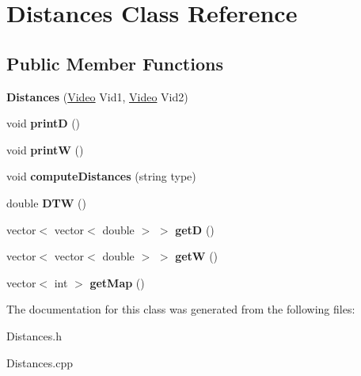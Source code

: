 \hypertarget{classDistances}{}\section{Distances Class Reference}
\label{classDistances}
\subsection*{Public Member Functions}
\begin{DoxyCompactItemize}
\item 
\hypertarget{classDistances_ab114594a2ed9235f058fe11a37fb6ec2}{}{\bfseries Distances} (\hyperlink{classVideo}{Video} Vid1, \hyperlink{classVideo}{Video} Vid2)\label{classDistances_ab114594a2ed9235f058fe11a37fb6ec2}

\item 
\hypertarget{classDistances_a5180e0b2a3bb9ab9521102f11c554ed5}{}void {\bfseries print\+D} ()\label{classDistances_a5180e0b2a3bb9ab9521102f11c554ed5}

\item 
\hypertarget{classDistances_a3089ebd3a732dedbcedf12d4ecff5345}{}void {\bfseries print\+W} ()\label{classDistances_a3089ebd3a732dedbcedf12d4ecff5345}

\item 
\hypertarget{classDistances_a7b6294bcd61a434f841d4fb35411662d}{}void {\bfseries compute\+Distances} (string type)\label{classDistances_a7b6294bcd61a434f841d4fb35411662d}

\item 
\hypertarget{classDistances_ae722418e8c1c2e5083b258768835380b}{}double {\bfseries D\+T\+W} ()\label{classDistances_ae722418e8c1c2e5083b258768835380b}

\item 
\hypertarget{classDistances_ae3950493295b9c5075109ab6e98258d8}{}vector$<$ vector$<$ double $>$ $>$ {\bfseries get\+D} ()\label{classDistances_ae3950493295b9c5075109ab6e98258d8}

\item 
\hypertarget{classDistances_aa299b0732b9c06a29e6c57ebfa410d14}{}vector$<$ vector$<$ double $>$ $>$ {\bfseries get\+W} ()\label{classDistances_aa299b0732b9c06a29e6c57ebfa410d14}

\item 
\hypertarget{classDistances_ad69949600306a0b1f360034826b9e4dd}{}vector$<$ int $>$ {\bfseries get\+Map} ()\label{classDistances_ad69949600306a0b1f360034826b9e4dd}

\end{DoxyCompactItemize}


The documentation for this class was generated from the following files\+:\begin{DoxyCompactItemize}
\item 
Distances.\+h\item 
Distances.\+cpp\end{DoxyCompactItemize}

